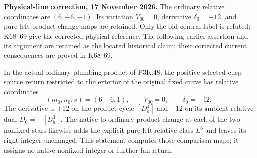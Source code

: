 \begin{theorem}\label{night:P3K.50}
\par\noindent\textbf{Physical-line correction, 17 November 2026.} The ordinary relative coordinates are \((6,-6,-1)\). Its variation \(V_{00}=0\), derivative \(\delta_0=-12\), and pure-left product-change maps are retained. Only the old central label is refuted; K68--69 give the corrected physical reference. The following earlier assertion and its argument are retained as the located historical claim; their corrected current consequences are proved in K68--69.\medskip\par 
In the actual ordinary plumbing product of P3K.48, the positive
selected-cusp source return restricted to the exterior of the
original fixed curve has relative coordinates
\[
 (m_0,n_0,s)=(6,-6,1),\qquad V_{00}=0,\qquad\delta_0=-12.
\]
The derivative is \(+12\) on the product cycle \([D^3_h]\) and
\(-12\) on its ambient relative dual \(D_0=-[D^3_h]\).
The native-to-ordinary product change at each of the two nonfixed
stars likewise adds the explicit pure-left relative class \(L^6\)
and leaves its right integer unchanged. This statement computes
those comparison maps; it assigns no native nonfixed integer or
further fan return.
\end{theorem}
